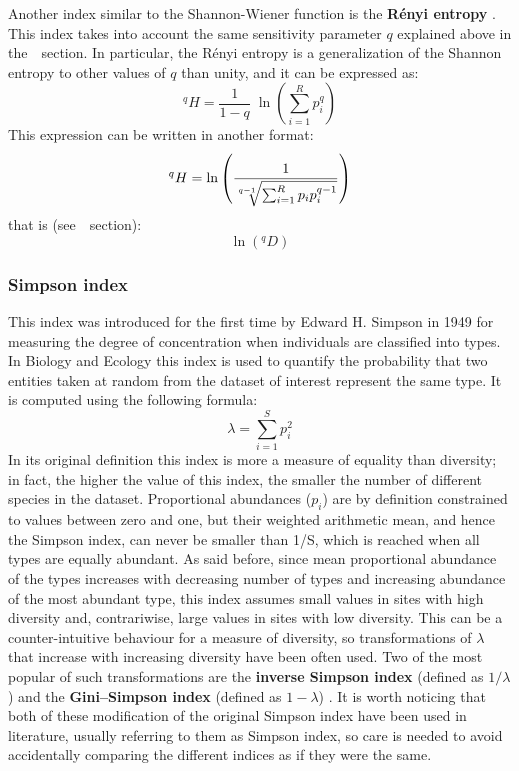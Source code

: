 Another index similar to the Shannon-Wiener function is the \textbf{R\'{e}nyi entropy} \cite{alfred1960measures}. This index takes into account the same sensitivity parameter $q$ explained above in the~~section. In particular, the R\'{e}nyi entropy is a generalization of the Shannon entropy to other values of $q$ than unity, and it can be expressed as:
\begin{equation*}
{}^qH = \frac{1}{1-q} \; \ln\left ( \sum_{i=1}^R p_i^q \right )
\end{equation*}
This expression can be written in another format:
\begin{equation*}
{}^qH = \ln\left ( {1 \over \sqrt[q-1]{{\sum_{i=1}^R p_i p_i^{q-1}}}} \right )
\end{equation*}
that is (see~~section): 
\begin{equation*}
\ln({}^q\!D)
\end{equation*}
\subsubsection*{Simpson index}
This index was introduced for the first time by Edward H. Simpson in 1949 \cite{simpson1949measurement} for measuring the degree of concentration when individuals are classified into types. In Biology and Ecology this index is used to quantify the probability that two entities taken at random from the dataset of interest represent the same type. It is computed using the following formula: 
\begin{equation*}
\lambda = \sum_{i=1}^S p_i^2
\end{equation*}
In its original definition this index is more a measure of equality than diversity; in fact, the higher the value of this index, the smaller the number of different species in the dataset. Proportional abundances ($p_i$) are by definition constrained to values between zero and one, but their weighted arithmetic mean, and hence the Simpson index, can never be smaller than 1/S, which is reached when all types are equally abundant. As said before, since mean proportional abundance of the types increases with decreasing number of types and increasing abundance of the most abundant type, this index assumes small values in sites with high diversity and,
contrariwise, large values in sites with low diversity. This can be a counter-intuitive behaviour for a measure of diversity, so transformations of $\lambda$ that increase with increasing diversity have been often used. Two of the most popular of such transformations are the \textbf{inverse Simpson index} (defined as $1/\lambda$) and the \textbf{Gini–Simpson index} (defined as $1 - \lambda$) \cite{hill1973diversity,jost2006entropy}. It is worth noticing that both of these modification of the original Simpson index have been used in literature, usually referring to them as Simpson index, so care is needed to avoid accidentally comparing the different indices as if they were the same.\\
\bigskip

